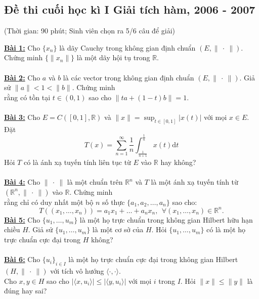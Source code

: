 \documentclass[10pt, a4paper]{article}
\begin{document}
\subsection{Đề thi cuối học kì I Giải tích hàm, 2006 - 2007}
\begin{center}
	\color{blue}(Thời gian: 90 phút; Sinh viên chọn ra 5/6 câu để giải)
\end{center}
\color{red}\underline{\textbf{Bài 1:}} \color{black}Cho $\{x_n\}$ là dãy Cauchy trong không gian định chuẩn $(E,\lVert~\cdot~\rVert)$. Chứng minh $\{\lVert x_n\rVert\}$ là một dãy hội tụ trong $\mathbb R$.\\\\
\color{red}\underline{\textbf{Bài 2:}} \color{black}Cho $a$ và $b$ là các vector trong không gian định chuẩn $(E,\lVert~\cdot~\rVert)$. Giả sử $\lVert a\rVert<1<\lVert b\rVert$. Chứng minh\\ rằng có tồn tại $t\in(0,1)$ sao cho $\lVert ta+(1-t)b\rVert=1$.\\\\
\color{red}\underline{\textbf{Bài 3:}} \color{black}Cho $E=C([0,1],\mathbb R)$ và $\lVert x\rVert=\displaystyle\sup_{t\in[0,1]}|x(t)|$ với mọi $x\in E$. Đặt $$T(x)=\displaystyle\sum_{n=1}^\infty\dfrac1n\displaystyle\int_{\frac{1}{n+1}}^{\frac1n}x(t)\text{d}t$$
Hỏi $T$ có là ánh xạ tuyến tính liên tục từ $E$ vào $\mathbb R$ hay không?\\\\
\color{red}\underline{\textbf{Bài 4:}} \color{black}Cho $\lVert~\cdot~\rVert$ là một chuẩn trên $\mathbb R^n$ và $T$ là một ánh xạ tuyến tính từ $(\mathbb R^n,\lVert~\cdot~\rVert)$ vào $\mathbb R$. Chứng minh\\ rằng chỉ có duy nhất một bộ $n$ số thực $\{a_1,a_2,\dots,a_n\}$ sao cho: $$T((x_1,\dots,x_n))=a_1x_1+\dots+a_nx_n,~~\forall(x_1,\dots,x_n)\in\mathbb R^n.$$
\color{red}\underline{\textbf{Bài 5:}} \color{black}Cho $\{u_1,\dots,u_m\}$ là một họ trực chuẩn trong không gian Hilbert hữu hạn chiều $H$. Giả sử $\{u_1,\dots,u_m\}$ là một cơ sở của $H$. Hỏi $\{u_1,\dots,u_m\}$ có là một họ trực chuẩn cực đại trong $H$ không?\\\\
\color{red}\underline{\textbf{Bài 6:}} \color{black}Cho $\{u_i\}_{i\in I}$ là một họ trực chuẩn cực đại trong không gian Hilbert $(H,\lVert~\cdot~\rVert)$ với tích vô hướng $\langle\cdot,\cdot\rangle$.\\ Cho $x,y\in H$ sao cho $|\langle x,u_i\rangle|\le|\langle y,u_i\rangle|$ với mọi $i$ trong $I$. Hỏi $\lVert x\rVert\le\lVert y\rVert$ là đúng hay sai?
\end{document}
